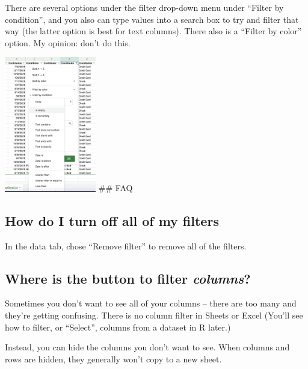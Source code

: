 \documentclass[
  letterpaper,
  DIV=11,
  numbers=noendperiod]{scrreprt}
\begin{document}
There are several options under the filter drop-down menu under ``Filter
by condition'', and you also can type values into a search box to try
and filter that way (the latter option is best for text columns). There
also is a ``Filter by color'' option. My opinion: don't do this.

\includegraphics[width=0.3\textwidth,height=\textheight]{./images/sheets-filter-sort-filter-options.png}
\#\# FAQ

\hypertarget{how-do-i-turn-off-all-of-my-filters}{%
\subsection*{How do I turn off all of my
filters}\label{how-do-i-turn-off-all-of-my-filters}}

In the data tab, chose ``Remove filter'' to remove all of the filters.

\hypertarget{where-is-the-button-to-filter-columns}{%
\subsection*{\texorpdfstring{Where is the button to filter
\emph{columns}?}{Where is the button to filter columns?}}\label{where-is-the-button-to-filter-columns}}

Sometimes you don't want to see all of your columns -- there are too
many and they're getting confusing. There is no column filter in Sheets
or Excel (You'll see how to filter, or ``Select'', columns from a
dataset in R later.)

Instead, you can hide the columns you don't want to see. When columns
and rows are hidden, they generally won't copy to a new sheet.

\end{document}
